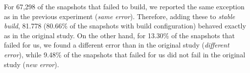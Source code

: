 \begin{table}[]
\caption{Changes in builds (original to replication).}
\label{table:causesDetailed}
\centering
{}
\end{table}

For 67,298 of the snapshots that failed to build, we reported the same exception as in the previous experiment (\textit{same error}). Therefore, adding these to \textit{stable build}, 81.778 (80.66\% of the snapshots with build configuration) behaved exactly as in the original study. On the other hand, for 13.30\% of the snapshots that failed for us, we found a different error than in the original study (\textit{different error}), while 9.48\% of the snapshots that failed for us did not fail in the original study (\textit{new error}).


